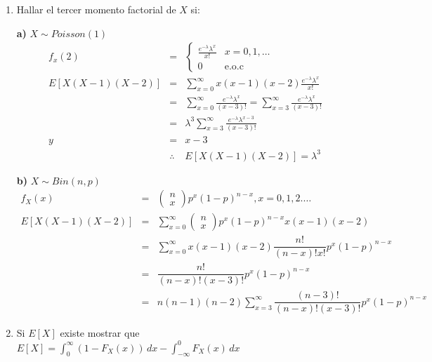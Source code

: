\begin{enumerate}
\item Hallar el tercer momento factorial de $X$ si:

\textbf{a)} $X \sim Poisson \left(1 \right)$
\begin{eqnarray*} 
f_{x}\left(2\right)&=& \begin{cases}
\frac{e^{-\lambda}\lambda ^{x}}{x!} & x= 0,1,\ldots\\
0 & \textrm{e.o.c}
\end{cases}\\
E\left[X\left(X-1\right)\left(X-2\right)\right] &=& \sum_{x=0}^{\infty} x \left(x-1\right)\left(x-2\right)\frac{e^{-\lambda}\lambda ^{x}}{x!}\\
&=& \sum_{x=0}^{\infty} \frac{e^{-\lambda}\lambda ^{x}}{\left( x-3\right)!} = \sum_{x=3}^{\infty}\frac{e^{-\lambda}\lambda ^{x}}{\left( x-3\right)!} \\
&=& \lambda ^{3} \sum_{x=3}^{\infty} \frac{e^{-\lambda}\lambda ^{x-3}}{\left( x-3\right)!}\\
y&=& x-3\\
&\therefore & E \left[X \left(X-1\right)\left(X-2\right) \right]= \lambda ^{3}
\end{eqnarray*}


\textbf{b)} $X \sim Bin \left(n,p \right)$
\begin{eqnarray*} 
f_{X}\left(x\right)&=& \left(\begin{array}{c}n\\x \end{array}\right)p^{x}\left(1-p\right)^{n-x}, x=0,1,2.\ldots \\
E \left[X \left(X-1 \right)\left(X-2 \right) \right] &=& \sum_{x=0}^{\infty} \left( \begin{array}{c} n\\x \end{array}\right)p^x \left( 1-p\right)^{n-x} x \left( x-1\right) \left(x-2 \right)\\
&=& \sum _{x=0}^{\infty}  x \left( x-1 \right) \left(x-2 \right) \dfrac{n!}{\left( n-x \right)! x! }  p^{x} \left( 1-p\right)^{n-x}\\
&=& \dfrac{n!}{\left( n-x \right)! \left( x-3\right)! }  p^{x} \left( 1-p\right)^{n-x}\\
&=& n \left(n-1 \right)\left(n-2 \right)\sum_{x=3}^{\infty}\dfrac{\left(n-3 \right)! }{\left( n-x \right)! \left( x-3\right)! } p^{x} \left( 1-p\right)^{n-x}
\end{eqnarray*}
 \item Si $E \left[X \right]$ existe mostrar que $E \left[X \right]= \int_{0}^{\infty} \left( 1 - F_{X}\left(x \right) \right)\, dx - \int_{-\infty}^{0} F_{X}\left(x \right)\, dx $


\end{enumerate}

